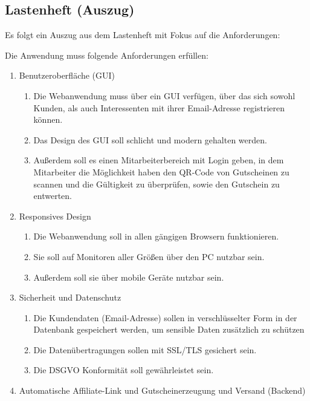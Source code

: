 \subsection{Lastenheft (Auszug)}
\label{app:Lastenheft}
Es folgt ein Auszug aus dem Lastenheft mit Fokus auf die Anforderungen:

Die Anwendung muss folgende Anforderungen erfüllen: 
\begin{enumerate}[itemsep=0em,partopsep=0em,parsep=0em,topsep=0em]
\item Benutzeroberfläche (\ac{GUI})
	\begin{enumerate}
	\item Die Webanwendung muss über ein \ac{GUI} verfügen, über das sich sowohl 
    Kunden, als auch Interessenten mit ihrer Email-Adresse
    registrieren können.
	\item Das Design des \ac{GUI} soll schlicht und modern gehalten werden.
        \item Außerdem soll es einen Mitarbeiterbereich mit Login geben,
        in dem Mitarbeiter die Möglichkeit haben den \ac{QR}-Code von Gutscheinen
        zu scannen und die Gültigkeit zu überprüfen, sowie den Gutschein zu entwerten.
	\end{enumerate}
\item Responsives Design
	\begin{enumerate}
	\item Die Webanwendung soll in allen gängigen Browsern funktionieren.
        \item Sie soll auf Monitoren aller Größen über den PC nutzbar sein.
        \item Außerdem soll sie über mobile Geräte nutzbar sein.
	\end{enumerate}
\item Sicherheit und Datenschutz
	\begin{enumerate}
        \item Die Kundendaten (Email-Adresse) sollen in verschlüsselter Form
        in der Datenbank gespeichert werden, um sensible Daten zusätzlich zu 
        schützen
        \item Die Datenübertragungen sollen mit \ac{SSL/TLS} gesichert sein.
        \item Die \ac{DSGVO} Konformität soll gewährleistet sein.
	\end{enumerate}
\item Automatische Affiliate-Link und Gutscheinerzeugung und Versand (Backend)
        \begin{enumerate}

\end{enumerate}
\end{enumerate}
